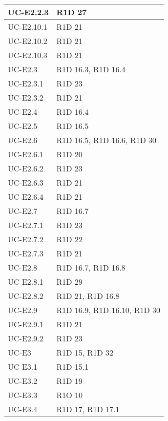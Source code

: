 \begin{center}
\begin{longtable}{ |  p{5cm} | p{5cm} |}
    UC-E2.2.3 & R1D 27 \\ \hline
    UC-E2.10.1 & R1D 21 \\ \hline
    UC-E2.10.2 & R1D 21 \\ \hline
    UC-E2.10.3 & R1D 21 \\ \hline
    UC-E2.3 & R1D 16.3, R1D 16.4 \\ \hline
    UC-E2.3.1 & R1D 23 \\ \hline
    UC-E2.3.2 & R1D 21 \\ \hline
    UC-E2.4 & R1D 16.4 \\ \hline
    UC-E2.5 & R1D 16.5 \\ \hline
    UC-E2.6 & R1D 16.5, R1D 16.6, R1D 30 \\ \hline
    UC-E2.6.1 & R1D 20 \\ \hline
    UC-E2.6.2 & R1D 23 \\ \hline
    UC-E2.6.3 & R1D 21 \\ \hline
    UC-E2.6.4 & R1D 21 \\ \hline
    UC-E2.7 & R1D 16.7 \\ \hline
    UC-E2.7.1 & R1D 23 \\ \hline
    UC-E2.7.2 & R1D 22 \\ \hline
    UC-E2.7.3 & R1D 21 \\ \hline
    UC-E2.8 & R1D 16.7, R1D 16.8 \\ \hline
    UC-E2.8.1 & R1D 29 \\ \hline
    UC-E2.8.2 & R1D 21, R1D 16.8 \\ \hline
    UC-E2.9 & R1D 16.9, R1D 16.10, R1D 30 \\ \hline 
    UC-E2.9.1 & R1D 21 \\ \hline
    UC-E2.9.2 & R1D 23 \\ \hline
    UC-E3 & R1D 15, R1D 32 \\ \hline
    UC-E3.1 & R1D 15.1 \\ \hline
    UC-E3.2 & R1D 19 \\ \hline
    UC-E3.3 & R1O 10 \\ \hline
    UC-E3.4 & R1D 17, R1D 17.1 \\ \hline
    \end{longtable}
  \egroup
\end{center}
